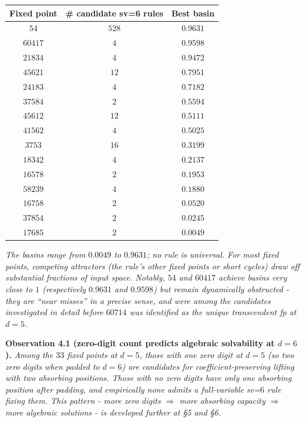 \documentclass[11pt,letterpaper]{article}
\theoremstyle{paperstyle}
\theoremstyle{paperstyledef}
\theoremstyle{paperstylerem}
\begin{document}
\begin{longtable}[]{@{}ccc@{}}
\toprule\noalign{}
Fixed point & \# candidate sv=6 rules & Best basin \\
\midrule\noalign{}
\endhead
\bottomrule\noalign{}
\endlastfoot
\(54\) & \(528\) & \(0.9631\) \\
\(60417\) & \(4\) & \(0.9598\) \\
\(21834\) & \(4\) & \(0.9472\) \\
\(45621\) & \(12\) & \(0.7951\) \\
\(24183\) & \(4\) & \(0.7182\) \\
\(37584\) & \(2\) & \(0.5594\) \\
\(45612\) & \(12\) & \(0.5111\) \\
\(41562\) & \(4\) & \(0.5025\) \\
\(3753\) & \(16\) & \(0.3199\) \\
\(18342\) & \(4\) & \(0.2137\) \\
\(16578\) & \(2\) & \(0.1953\) \\
\(58239\) & \(4\) & \(0.1880\) \\
\(16758\) & \(2\) & \(0.0520\) \\
\(37854\) & \(2\) & \(0.0245\) \\
\(17685\) & \(2\) & \(0.0049\) \\
\end{longtable}

\emph{The basins range from \(0.0049\) to \(0.9631\); no rule is
universal. For most fixed points, competing attractors (the rule's other
fixed points or short cycles) draw off substantial fractions of input
space. Notably, \(54\) and \(60417\) achieve basins very close to \(1\)
(respectively \(0.9631\) and \(0.9598\)) but remain dynamically
obstructed - they are ``near misses'' in a precise sense, and were
among the candidates investigated in detail before \(60714\) was
identified as the unique transcendent fp at \(d = 5\).}

\textbf{Observation 4.1 (zero-digit count predicts algebraic solvability
at \(d = 6\)).} \emph{Among the \(33\) fixed points at \(d = 5\), those
with one zero digit at \(d = 5\) (so two zero digits when padded to
\(d = 6\)) are candidates for coefficient-preserving lifting with two
absorbing positions. Those with no zero digits have only one absorbing
position after padding, and empirically none admits a full-variable
sv=\(6\) rule fixing them. This pattern - more zero digits
\(\Rightarrow\) more absorbing capacity \(\Rightarrow\) more algebraic
solutions - is developed further at §5 and §6.}
\end{document}
